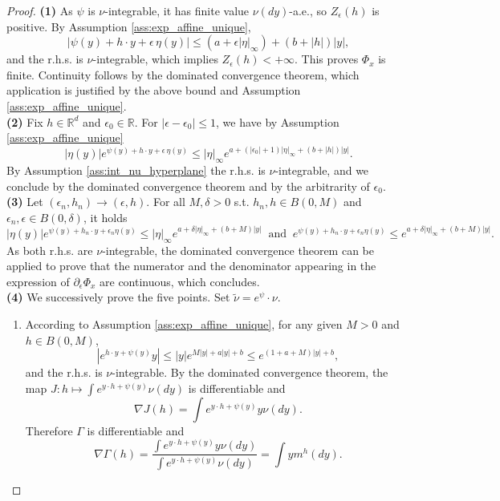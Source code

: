 \documentclass[reqno, a4paper]{amsart}
\theoremstyle{plain}
\theoremstyle{definition}
\theoremstyle{remark}
\numberwithin{equation}{section}
\numberwithin{theorem}{section}
\newcommand{\R}{\mathbb{R}}
\begin{document}
	\begin{proof}
		\textbf{(1)} As $\psi$ is $\nu$-integrable, it has finite value $\nu(dy)$-a.e., so $Z_\epsilon(h)$ is positive. By Assumption \ref{ass:exp_affine_unique}, $$|\psi(y)+h\cdot y+\epsilon\,\eta(y)| \leq (a + \epsilon |\eta|_\infty) + (b+ |h|)|y|,$$ and the r.h.s. is $\nu$-integrable, which implies $Z_\epsilon(h) < +\infty$. This proves $\Phi_x$ is finite. Continuity follows by the dominated convergence theorem, which application is justified by the above bound and Assumption \ref{ass:exp_affine_unique}.\\
		\textbf{(2)} 
		Fix $h \in \R^d$ and $\epsilon_0 \in \R$. For  $|\epsilon - \epsilon_0| \leq 1$, we have by Assumption \ref{ass:exp_affine_unique} $$|\eta(y)| e^{\psi(y)+h\cdot y+\epsilon\,\eta(y)} \leq |\eta|_\infty   e^{a +(|\epsilon_0| + 1) |\eta|_\infty + (b+ |h|)|y|}.$$ By Assumption \ref{ass:int_nu_hyperplane} the r.h.s. is $\nu$-integrable, and we conclude by the dominated convergence theorem and by the arbitrarity of $\epsilon_0$.\\
		\textbf{(3)} Let $(\epsilon_n,h_n) \to (\epsilon,h)$.
		For all $M,\delta>0$ s.t. $h_n,h \in B(0,M)$ and $\epsilon_n,\epsilon \in B(0, \delta)$, it holds
		\[|\eta(y)|e^{\psi(y)+h_n \cdot y + \epsilon_n \eta(y)} \leq |\eta|_\infty e^{a + \delta|\eta|_\infty+  (b+ M)|y|} \; \; \text{and}\; \; e^{\psi(y)+h_n \cdot y+\epsilon_n \eta(y)} \leq  e^{a +\delta|\eta|_\infty+  (b+ M)|y|}.\] As both r.h.s. are $\nu$-integrable, the dominated convergence theorem can be applied to prove that the numerator and the denominator appearing in the expression of $\partial_\epsilon \Phi_x$ are continuous, which concludes.\\
		\textbf{(4)} We successively prove the five points. Set $\tilde{\nu} = e^{\psi}\cdot \nu$.
		\begin{enumerate}
			\item[(a)] According to Assumption \ref{ass:exp_affine_unique}, for any given $M>0$ and $h \in B(0,M)$,
			\begin{equation*}
				|e^{h \cdot y + \psi(y)}y| \leq |y| e^{M|y| + a|y|+b} \leq e^{(1+a+M)|y| + b},
			\end{equation*}
			and the r.h.s. is $\nu$-integrable. By the dominated convergence theorem, the map $J: h \mapsto \int e^{y \cdot h + \psi(y)} \nu(dy)$ is differentiable and $$ \nabla J (h) =  \int e^{y \cdot h + \psi(y)} y\nu(dy).$$ Therefore $\Gamma$ is differentiable and $$\nabla \Gamma(h) = \frac{\int e^{y \cdot h + \psi(y)} y\nu(dy)}{\int e^{y \cdot h + \psi(y)} \nu(dy)} = \int y m^h(dy).$$

\end{enumerate}
\end{proof}
\end{document}
